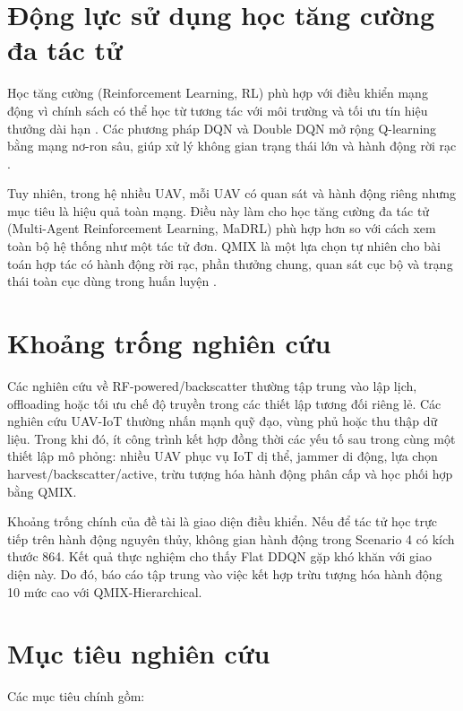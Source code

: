 \section{Động lực sử dụng học tăng cường đa tác tử}

Học tăng cường (Reinforcement Learning, RL) phù hợp với điều khiển mạng động vì chính sách có thể học từ tương tác với môi trường và tối ưu tín hiệu thưởng dài hạn \cite{sutton2018reinforcement}. Các phương pháp DQN và Double DQN mở rộng Q-learning bằng mạng nơ-ron sâu, giúp xử lý không gian trạng thái lớn và hành động rời rạc \cite{mnih2015dqn,vanhasselt2016ddqn}.

Tuy nhiên, trong hệ nhiều UAV, mỗi UAV có quan sát và hành động riêng nhưng mục tiêu là hiệu quả toàn mạng. Điều này làm cho học tăng cường đa tác tử (Multi-Agent Reinforcement Learning, MaDRL) phù hợp hơn so với cách xem toàn bộ hệ thống như một tác tử đơn. QMIX là một lựa chọn tự nhiên cho bài toán hợp tác có hành động rời rạc, phần thưởng chung, quan sát cục bộ và trạng thái toàn cục dùng trong huấn luyện \cite{rashid2018qmix}.

\section{Khoảng trống nghiên cứu}

Các nghiên cứu về RF-powered/backscatter thường tập trung vào lập lịch, offloading hoặc tối ưu chế độ truyền trong các thiết lập tương đối riêng lẻ. Các nghiên cứu UAV-IoT thường nhấn mạnh quỹ đạo, vùng phủ hoặc thu thập dữ liệu. Trong khi đó, ít công trình kết hợp đồng thời các yếu tố sau trong cùng một thiết lập mô phỏng: nhiều UAV phục vụ IoT dị thể, jammer di động, lựa chọn harvest/backscatter/active, trừu tượng hóa hành động phân cấp và học phối hợp bằng QMIX.

Khoảng trống chính của đề tài là giao diện điều khiển. Nếu để tác tử học trực tiếp trên hành động nguyên thủy, không gian hành động trong Scenario 4 có kích thước 864. Kết quả thực nghiệm cho thấy Flat DDQN gặp khó khăn với giao diện này. Do đó, báo cáo tập trung vào việc kết hợp trừu tượng hóa hành động 10 mức cao với QMIX-Hierarchical.

\section{Mục tiêu nghiên cứu}

Các mục tiêu chính gồm:


